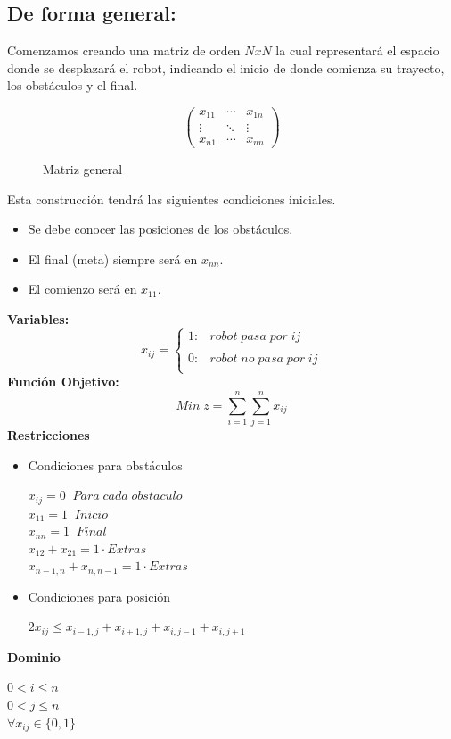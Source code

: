 \documentclass[journal, 10pt]{IEEEtran}
\begin{document}
\subsection{De forma general:}
Comenzamos creando una matriz de orden $NxN$ la cual representará el espacio donde se desplazará el robot, indicando el inicio de donde comienza su trayecto, los obstáculos y el final.\\
\begin{figure}[H]
 \[ \left( \begin{array}{ccc}
{x}_{11} & \cdots & {x}_{1n} \\
\vdots & \ddots & \vdots \\
{x}_{n1} & \cdots & {x}_{nn} \end{array} \right)\] 
\caption{Matriz general}
\end{figure}
Esta construcción tendrá las siguientes condiciones iniciales.
\begin{itemize}
    \item Se debe conocer las posiciones de los obstáculos.
    \item El final (meta) siempre será en ${x}_{nn}$.
    \item El comienzo será en ${x}_{11}$.
\end{itemize}
\textbf{Variables:}
\[
{x}_{ij}= \left\{ \begin{array}{lcc}
             1: &   robot\;pasa\;por\;ij \\
             \\ 0: &  robot\;no\;pasa\;por\;ij \\
             
             \end{array}
   \right.
\]
\textbf{Función Objetivo:}
\[ Min\;z = \sum_{i=1}^n\sum_{j=1}^n{x}_{ij}\]
\textbf{Restricciones}
\begin{itemize}
    \item Condiciones para obstáculos \\
    \begin{center}
        ${x}_{ij} = 0\;\;Para\;cada\;obstaculo$\\
        ${x}_{11} = 1\;\;Inicio$\\
        ${x}_{nn} = 1\;\;Final$\\
        ${x}_{12}+ {x}_{21} = 1 \cdot   Extras$\\
        ${x}_{n-1,n}+ {x}_{n,n-1} = 1 \cdot   Extras$\\ 
    \end{center}
    \item Condiciones para posición
    \begin{center}
        ${2x}_{ij} \leq{x}_{i-1,j}+{x}_{i+1,j}+{x}_{i,j-1}+{x}_{i,j+1}$\\
    \end{center}
\end{itemize}
\textbf{Dominio}
\begin{center}
        $0<i\leq n$\\
        $0<j\leq n$\\
        $\forall {x}_{ij} \in \{0,1\}$
    \end{center}
\end{document}
